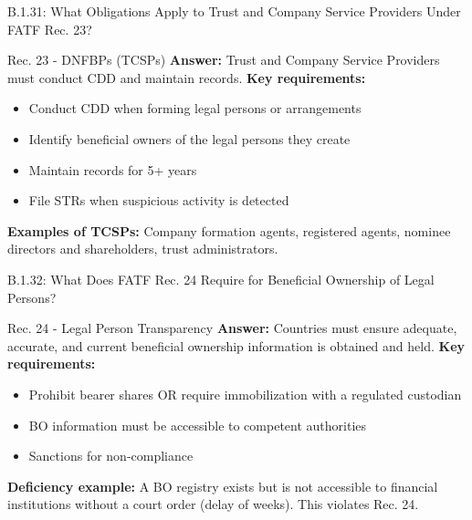 \documentclass{beamer}
\begin{document}
	\begin{frame}{B.1.31: What Obligations Apply to Trust and Company Service Providers Under FATF Rec. 23?}
		\begin{block}{Rec. 23 - DNFBPs (TCSPs)}
			\textbf{Answer:} Trust and Company Service Providers must conduct CDD and maintain records.
			\vspace{0.2cm}
			\textbf{Key requirements:}
			\begin{itemize}
				\item Conduct CDD when forming legal persons or arrangements
				\item Identify beneficial owners of the legal persons they create
				\item Maintain records for 5+ years
				\item File STRs when suspicious activity is detected
			\end{itemize}
			\textbf{Examples of TCSPs:} Company formation agents, registered agents, nominee directors and shareholders, trust administrators.
		\end{block}
	\end{frame}
	
	\begin{frame}{B.1.32: What Does FATF Rec. 24 Require for Beneficial Ownership of Legal Persons?}
		\begin{block}{Rec. 24 - Legal Person Transparency}
			\textbf{Answer:} Countries must ensure adequate, accurate, and current beneficial ownership information is obtained and held.
			\vspace{0.2cm}
			\textbf{Key requirements:}
			\begin{itemize}
				\item Prohibit bearer shares OR require immobilization with a regulated custodian
				\item BO information must be accessible to competent authorities
				\item Sanctions for non-compliance
			\end{itemize}
			\textbf{Deficiency example:} A BO registry exists but is not accessible to financial institutions without a court order (delay of weeks). This violates Rec. 24.
		\end{block}
	\end{frame}
	
\end{document}
